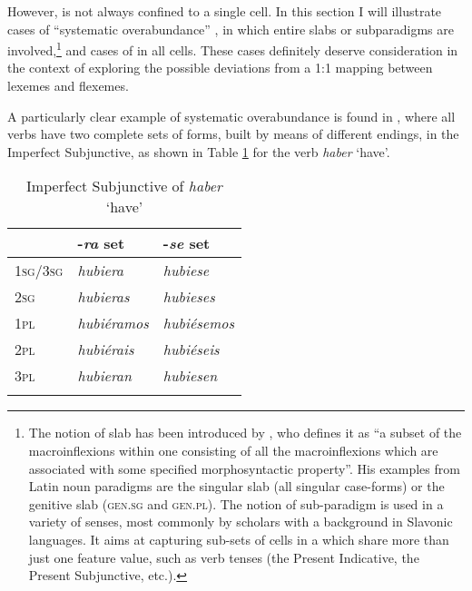 \documentclass[output=paper]{langsci/langscibook}
\begin{document}
\largerpage[-1]
However,  is not always confined to a single cell. In this
section I will illustrate cases of ``systematic overabundance'' %
\citep[469]{Bonami:Stump16:PFM}%
%
, in which entire slabs or subparadigms are
involved,\footnote{The notion of slab has been introduced by %
\citet[81]{Carstairs1987}%
%
, who defines it as ``a subset of the macroinflexions within
  one  consisting of all the macroinflexions which are
  associated with some specified morphosyntactic property''. His
  examples from Latin noun paradigms are the singular slab (all singular
  case-forms) or the genitive slab (\textsc{gen.sg} and
  \textsc{gen.pl}). The notion of sub-paradigm is used in a variety of
  senses, most commonly by scholars with a background in Slavonic
  languages. It aims at capturing sub-sets of cells in a  which
  share more than just one feature value, such as verb tenses (the
  Present Indicative, the Present Subjunctive, etc.).} and cases of
 in all cells. These cases definitely deserve consideration
in the context of exploring the possible deviations from a 1:1 mapping
between lexemes and flexemes.

A particularly clear example of systematic overabundance is found in
, where all verbs have two complete sets of forms, built by means
of different endings, in the Imperfect Subjunctive, as shown in Table \ref{tab:Thornton:1} for the verb \emph{haber} `have'.

  \begin{table}
  \begin{tabular}{lll}
  \lsptoprule
  & -\emph{ra} set  & -\emph{se} set\\
  \midrule
  \textsc{1sg\slash{}3sg} & \emph{hubiera} & \emph{hubiese}\\
  \textsc{2sg} & \emph{hubieras} & \emph{hubieses}\\
  \textsc{1pl} & \emph{hubiéramos} & \emph{hubiésemos}\\
  \textsc{2pl} & \emph{hubiérais} & \emph{hubiéseis}\\
  \textsc{3pl } & \emph{hubieran} & \emph{hubiesen}\\
  \lspbottomrule
  \end{tabular}
  \caption{Imperfect Subjunctive of  \textit{haber} `have'}
  \label{tab:Thornton:1}
  \end{table}
\end{document}
